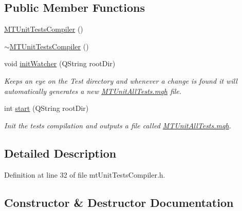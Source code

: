 \subsection*{Public Member Functions}
\begin{DoxyCompactItemize}
\item 
\mbox{\hyperlink{class_m_t_unit_tests_compiler_a967536920e13cf8a653211135fd6b0e2}{M\+T\+Unit\+Tests\+Compiler}} ()
\item 
\mbox{\hyperlink{class_m_t_unit_tests_compiler_a455bbf3b47473ebb553a78421f538f23}{$\sim$\+M\+T\+Unit\+Tests\+Compiler}} ()
\item 
void \mbox{\hyperlink{class_m_t_unit_tests_compiler_afab7db9083a0cd6869b69c989898e4ee}{init\+Watcher}} (Q\+String root\+Dir)
\begin{DoxyCompactList}\small\item\em Keeps an eye on the Test directory and whenever a change is found it will automatically generates a new \mbox{\hyperlink{_m_t_unit_all_tests_8mqh}{M\+T\+Unit\+All\+Tests.\+mqh}} file. \end{DoxyCompactList}\item 
int \mbox{\hyperlink{class_m_t_unit_tests_compiler_ac87a287b33abd2f15d2af2c589afdb73}{start}} (Q\+String root\+Dir)
\begin{DoxyCompactList}\small\item\em Init the tests compilation and outputs a file called \mbox{\hyperlink{_m_t_unit_all_tests_8mqh}{M\+T\+Unit\+All\+Tests.\+mqh}}. \end{DoxyCompactList}\end{DoxyCompactItemize}


\subsection{Detailed Description}


Definition at line 32 of file mt\+Unit\+Tests\+Compiler.\+h.



\subsection{Constructor \& Destructor Documentation}
\mbox{\label{class_m_t_unit_tests_compiler_a967536920e13cf8a653211135fd6b0e2}} 
